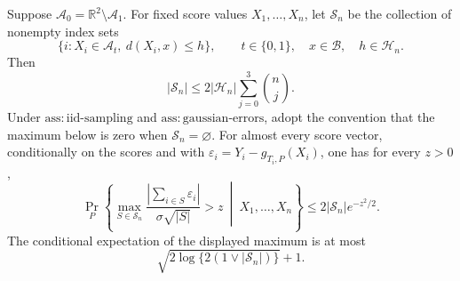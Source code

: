 Suppose \(\mathcal A_0=\mathbb R^2\setminus\mathcal A_1\). For fixed score values \(X_1,\ldots,X_n\), let \(\mathscr S_n\) be the collection of nonempty index sets
\[
 \{i:X_i\in\mathcal A_t,\ d(X_i,x)\le h\},\qquad
 t\in\{0,1\},\quad x\in\mathcal B,\quad h\in\mathcal H_n.
\]
Then
\[
 |\mathscr S_n|\le2|\mathcal H_n|\sum_{j=0}^3\binom nj.
\]
Under \(\mathrm{ass:iid\text{-}sampling}\) and \(\mathrm{ass:gaussian\text{-}errors}\), adopt the convention that the maximum below is zero when \(\mathscr S_n=\varnothing\). For almost every score vector, conditionally on the scores and with \(\varepsilon_i=Y_i-g_{T_i,P}(X_i)\), one has for every \(z>0\),
\[
 \Pr_P\left\{\max_{S\in\mathscr S_n}
 \frac{|\sum_{i\in S}\varepsilon_i|}{\sigma\sqrt{|S|}}>z
 \ \middle|\ X_1,\ldots,X_n\right\}
 \le2|\mathscr S_n|e^{-z^2/2}.
\]
The conditional expectation of the displayed maximum is at most
\[
 \sqrt{2\log\{2(1\vee|\mathscr S_n|)\}}+1.
\]